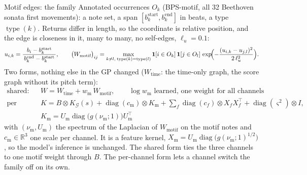\documentclass[aspectratio=169,11pt]{beamer}
\newcommand{\R}{\mathbb{R}}
\newcommand{\diag}{\operatorname{diag}}
\begin{document}
\begin{frame}{Motif edges: the family}
  \footnotesize
  Annotated occurrences $O_k$ (BPS-motif, all 32 Beethoven sonata first
  movements): a note set, a span $[b_k^{\text{start}}, b_k^{\text{end}}]$
  in beats, a type $\operatorname{type}(k)$. Returns differ in length, so the coordinate is
  relative position, and the edge is closeness in it, many to many, no
  self-edges, $\ell_u = 0.1$:
  \[
    u_{i,k} = \frac{b_i - b_k^{\text{start}}}{\,b_k^{\text{end}} - b_k^{\text{start}}\,},
    \qquad
    \bigl(W_{\text{motif}}\bigr)_{ij} =
    \max_{k \neq l,\; \operatorname{type}(k) = \operatorname{type}(l)} \mathbf 1[i \in O_k]\, \mathbf 1[j \in O_l]\,
    \exp\!\Bigl(-\frac{(u_{i,k} - u_{j,l})^2}{2\,\ell_u^2}\Bigr).
  \]
  Two forms, nothing else in the GP changed ($W_{\text{time}}$: the
  time-only graph, the score graph without its pitch term):
  \begin{align*}
    \text{shared: }& W = W_{\text{time}} + w_{\text{m}}\, W_{\text{motif}},\qquad
      \log w_{\text{m}} \text{ learned, one weight for all channels}\\
    \text{per channel: }& K = B \otimes K_{\mathcal G}(s)
      + \diag(c_{\text{m}}) \otimes K_{\text{m}}
      + \textstyle\sum_f \diag(c_f) \otimes X_f X_f^{\top}
      + \diag(\varsigma^2) \otimes I,\\
      & K_{\text{m}} = U_{\text{m}} \diag\bigl(g(\nu_{\text{m}}; 1)\bigr) U_{\text{m}}^{\top}
  \end{align*}
  with $(\nu_{\text{m}}, U_{\text{m}})$ the spectrum of the Laplacian of
  $W_{\text{motif}}$ on the motif notes and $c_{\text{m}} \in \R^3$ one
  scale per channel. It is a feature kernel,
  $X_{\text{m}} = U_{\text{m}}\diag\bigl(g(\nu_{\text{m}};1)^{1/2}\bigr)$, so
  the model's inference is unchanged. The shared form ties the three
  channels to one motif weight through $B$. The per-channel form lets a
  channel switch the family off on its own.
\end{frame}
\end{document}
